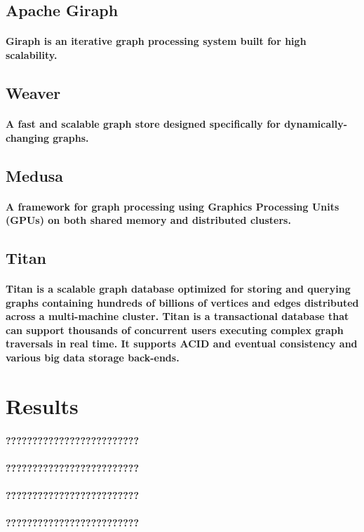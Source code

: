 \documentclass{acm_proc_article-sp}
\begin{document}
\subsection{Apache Giraph}
\paragraph{Giraph is an iterative graph processing system built for high scalability.\cite{ching2013scaling}}
\subsection{Weaver}
\paragraph{A fast and scalable graph store designed specifically for dynamically-changing graphs.\cite{wu2012kernel}}
\subsection{Medusa}
\paragraph{A framework for graph processing using Graphics Processing Units (GPUs) on both shared memory and distributed clusters.\cite{zhong2014medusa}}
\subsection{Titan}
\paragraph{Titan is a scalable graph database optimized for storing and querying graphs containing hundreds of billions of vertices and edges distributed across a multi-machine cluster. Titan is a transactional database that can support thousands of concurrent users executing complex graph traversals in real time. It supports ACID and eventual consistency and various big data storage back-ends.\cite{chang1997titan}}
\pagebreak
\section{Results}
\paragraph{?????????????????????????}
\paragraph{?????????????????????????}
\paragraph{?????????????????????????}
\paragraph{?????????????????????????}
\pagebreak


\end{document}

